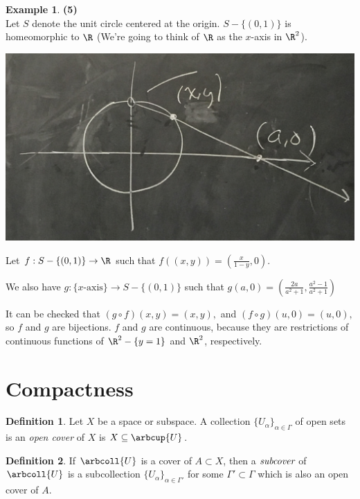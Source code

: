\documentclass[a5paper]{article}
\theoremstyle{definition}%
\newtheorem*{definition*}{Definition}
\newtheorem*{example*}{Example}
\numberwithin{exercise}{section}
\theoremstyle{remark}%
\begin{document}
\begin{example*}\textbf{(5)}\\
Let $S$ denote the unit circle centered at the origin. $S-\{(0,1)\}$ is homeomorphic to $\R$ (We're going to think of $\R$ as the $x$-axis in $\R^2$).

\begin{center}
\includegraphics[scale=.07]{images/s_circ_projec}
\end{center}

Let $f:S-\{(0,1)\}\to \R$ such that $f((x,y))=(\frac{x}{1-y	},0)$. 

We also have $g:\{x\text{-axis}\}\to S-\{(0,1)\}$ such that $g(a,0)=\left(\frac{2a}{a^2+1}, \frac{a^2-1}{a^2+1}\right)$

It can be checked that $(g\circ f)(x,y)=(x,y),$ and $(f\circ g)(u,0)=(u,0),$ so $f$ and $g$ are bijections. $f$ and $g$ are continuous, because they are restrictions of continuous functions of $\R^2-\{y=1\}$ and $\R^2$, respectively. 
\end{example*}

\section{Compactness}

\begin{definition*}
Let $X$ be a space or subspace. A collection $\{U_\alpha\}_{\alpha\in\Gamma}$ of open sets is an \emph{open cover} of $X$ is $X\subseteq\arbcup{U}$. 
\end{definition*}

\begin{definition*}

If $\arbcoll{U}$ is a cover of $A\subset X$, then a $\emph{subcover}$ of $\arbcoll{U}$ is a subcollection $\{U_\alpha\}_{\alpha\in\Gamma'}$ for some $\Gamma'\subset\Gamma$ which is also an open cover of $A$. 

\end{definition*}
\end{document}
